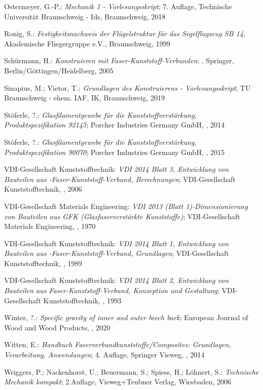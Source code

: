 \begin{thebibliography}{99}
	Ostermeyer, G.-P.:
	\textit{\glqq Mechanik 1 - Vorlesungsskript\grqq};
	7. Auflage, Technische Universität Braunschweig - Ids, Braunschweig, 2018 
	
	Ronig, S.:
	\textit{\glqq Festigkeitsnachweis der Flügelstruktur für das Segelflugzeug SB 14\grqq};
	Akademische Fliegergruppe e.V., Braunschweig, 1999 
	
	Schürmann, H.:
	\textit{\glqq Konstruieren mit Faser-Kunststoff-Verbunden\grqq};
	, Springer, Berlin/Göttingen/Heidelberg, 2005 
	
	Sinapius, M.; Vietor, T.:
	\textit{\glqq Grundlagen des Konstruierens - Vorlesungsskript\grqq};
	TU Braunschweig - ehem. IAF, IK, Braunschweig, 2019
	
	Stöferle, ?.:
	\textit{\glqq Glasfilamentgewebe für die Kunststoffverstärkung, Produktspezifikation 92145\grqq};
	Porcher Industries Germany GmbH, , 2014
	
	Stöferle, ?.:
	\textit{\glqq Glasfilamentgewebe für die Kunststoffverstärkung, Produktspezifikation 90070\grqq};
	Porcher Industries Germany GmbH, , 2015
	
	VDI-Gesellschaft Kunststofftechnik:
	\textit{\glqq VDI 2014 Blatt 3, Entwicklung von Bauteilen aus -Faser-Kunststoff-Verbund, Berechnungen\grqq};
	VDI-Gesellschaft Kunststofftechnik, , 2006
	
	VDI-Gesellschaft Materials Engineering:
	\textit{\glqq VDI 2013 (Blatt 1)-Dimensionierung von Bauteilen aus GFK (Glasfaserverstärkte Kunststoffe)\grqq};
	VDI-Gesellschaft Materials Engineering, , 1970
	
	VDI-Gesellschaft Kunststofftechnik:
	\textit{\glqq VDI 2014 Blatt 1, Entwicklung von Bauteilen aus -Faser-Kunststoff-Verbund, Grundlagen\grqq};
	VDI-Gesellschaft Kunststofftechnik, , 1989

	VDI-Gesellschaft Kunststofftechnik:
	\textit{\glqq VDI 2014 Blatt 2, Entwicklung von Bauteilen aus Faser-Kunststoff-Verbund, Konzeption und Gestaltung\grqq};
	VDI-Gesellschaft Kunststofftechnik, , 1993 
	
	Winter, ?.:
	\textit{\glqq Specific gravity of inner and outer beech bark\grqq};
	European Journal of Wood and Wood Products, , 2020
	
	Witten, E.:
	\textit{\glqq Handbuch Faserverbundkunststoffe/Composites: Grundlagen, Verarbeitung, Anwendungen\grqq};
	4. Auflage, Springer Vieweg, , 2014 
	
	Wriggers, P.; Nackenhorst, U.; Beuermann, S.; Spiess, H.; Löhnert, S.:
	\textit{\glqq Technische Mechanik kompakt\grqq};
	2.Auflage, Vieweg+Teubner Verlag, Wiesbaden, 2006
	
\end{thebibliography}
\endgroup
